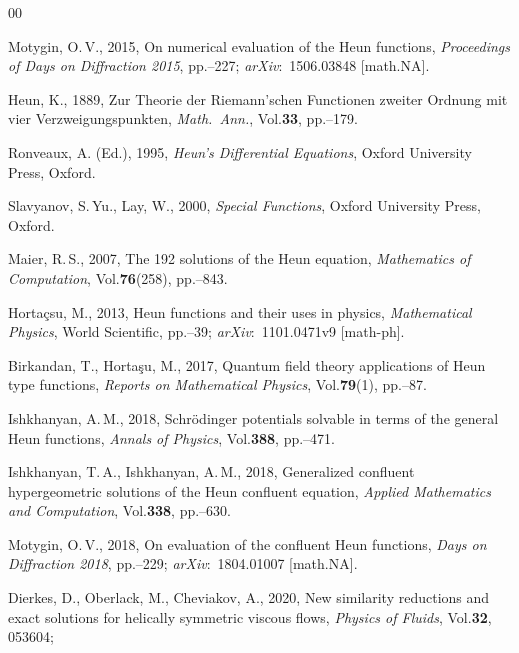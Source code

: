 \documentclass[11pt]{article}
\begin{document}
\begin{thebibliography}{00}

 Motygin, O.\,V., 2015,
On numerical evaluation of the Heun functions, \textit{Proceedings of Days on Diffraction 2015}, pp.--227;
\textit{arXiv}:\ 1506.03848 [math.NA].

 Heun, K., 1889, Zur Theorie der Rie\-mann'\-schen Func\-tio\-nen zweiter
Ordnung mit vier Ver\-zwei\-gungs\-punk\-ten, \textit{Math.\ Ann.}, Vol.\;\textbf{33}, pp.--179.

 Ronveaux, A. (Ed.), 1995, \emph{Heun's Differential
Equations}, Oxford University Press, Oxford.

 Slavyanov, S.\,Yu., Lay, W., 2000, \emph{Special Functions},
Oxford University Press, Oxford.

 Maier, R.\,S., 2007, The 192 solutions of the Heun equation,
\textit{Mathematics of Computation}, Vol.\;\textbf{76}(258), pp.--843.

 Horta\c{c}su, M., 2013, Heun functions and their uses in physics, \textit{Mathematical Physics}, World Scientific, pp.--39; \textit{arXiv\/}:\ 1101.0471v9 [math-ph].

Birkandan, T., Horta\c{s}u, M., 2017, Quantum field theory applications of Heun type functions,
\textit{Reports on Mathematical Physics},
Vol.\;\textbf{79}(1), pp.--87.

  Ishkhanyan, A.\,M., 2018,  Schr\"odinger   potentials   solvable   in   terms   of   the   general   Heun   functions, \textit{Annals of Physics}, Vol.\;\textbf{388}, pp.--471.

 Ishkhanyan, T.\,A.,  Ishkhanyan, A.\,M., 2018, Generalized confluent hypergeometric solutions of the Heun confluent equation, \textit{Applied Mathematics and Computation}, Vol.\;\textbf{338}, pp.--630.

 Motygin, O.\,V., 2018, On evaluation of the confluent Heun functions, \textit{Days on Diffraction 2018}, pp.--229; \textit{arXiv\/}:\ 1804.01007 [math.NA].

 Dierkes, D., Oberlack, M., Cheviakov, A., 2020,
New similarity reductions and exact
solutions for helically symmetric viscous
flows,
\textit{Physics of Fluids}, Vol.\;\textbf{32}, 053604;


\end{thebibliography}
\end{document}
